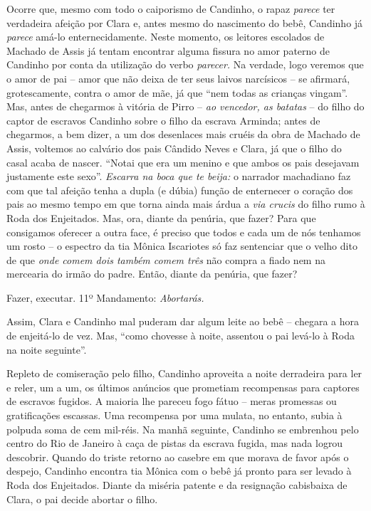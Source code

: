 Ocorre que, mesmo com todo o caiporismo de Candinho, o rapaz
\emph{parece} ter verdadeira afeição por Clara e, antes mesmo do
nascimento do bebê, Candinho já \emph{parece} amá-lo enternecidamente.
Neste momento, os leitores escolados de Machado de Assis já tentam
encontrar alguma fissura no amor paterno de Candinho por conta da
utilização do verbo \emph{parecer.} Na verdade, logo veremos que o amor
de pai -- amor que não deixa de ter seus laivos narcísicos -- se
afirmará, grotescamente, contra o amor de mãe, já que ``nem todas as
crianças vingam''. Mas, antes de chegarmos à vitória de Pirro --
\emph{ao vencedor, as batatas} -- do filho do captor de escravos
Candinho sobre o filho da escrava Arminda; antes de chegarmos, a bem
dizer, a um dos desenlaces mais cruéis da obra de Machado de Assis,
voltemos ao calvário dos pais Cândido Neves e Clara, já que o filho do
casal acaba de nascer. ``Notai que era um menino e que ambos os pais
desejavam justamente este sexo''. \emph{Escarra na boca que te beija:} o
narrador machadiano faz com que tal afeição tenha a dupla (e dúbia)
função de enternecer o coração dos pais ao mesmo tempo em que torna
ainda mais árdua a \emph{via crucis} do filho rumo à Roda dos
Enjeitados. Mas, ora, diante da penúria, que fazer? Para que consigamos
oferecer a outra face, é preciso que todos e cada um de nós tenhamos um
rosto -- o espectro da tia Mônica Iscariotes só faz sentenciar que o
velho dito de que \emph{onde comem dois também comem três} não compra a
fiado nem na mercearia do irmão do padre. Então, diante da penúria, que
fazer?

Fazer, executar. 11º Mandamento: \emph{Abortarás. }

Assim, Clara e Candinho mal puderam dar algum leite ao bebê -- chegara a
hora de enjeitá-lo de vez. Mas, ``como chovesse à noite, assentou o pai
levá-lo à Roda na noite seguinte''.

Repleto de comiseração pelo filho, Candinho aproveita a noite derradeira
para ler e reler, um a um, os últimos anúncios que prometiam recompensas
para captores de escravos fugidos. A maioria lhe pareceu fogo fátuo --
meras promessas ou gratificações escassas. Uma recompensa por uma
mulata, no entanto, subia à polpuda soma de cem mil-réis. Na manhã
seguinte, Candinho se embrenhou pelo centro do Rio de Janeiro à caça de
pistas da escrava fugida, mas nada logrou descobrir. Quando do triste
retorno ao casebre em que morava de favor após o despejo, Candinho
encontra tia Mônica com o bebê já pronto para ser levado à Roda dos
Enjeitados. Diante da miséria patente e da resignação cabisbaixa de
Clara, o pai decide abortar o filho.

